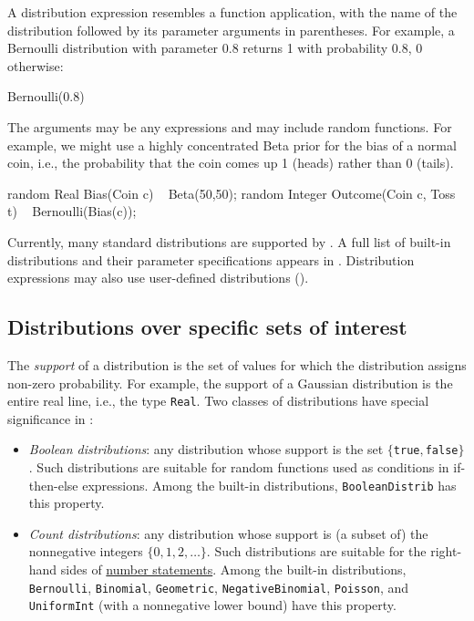 \documentclass[12pt]{article}
\begin{document}
A distribution expression resembles a function application, with the name of the distribution followed by its parameter arguments in parentheses. For example, a Bernoulli distribution with parameter 0.8
returns 1 with probability 0.8, 0 otherwise:
\begin{blogcode}
Bernoulli(0.8)
\end{blogcode}
The arguments may be any expressions and may include random functions. For example,
we might use a highly concentrated Beta prior for the bias of a normal coin, i.e., the probability that the coin comes up 1 (heads) rather than 0 (tails).
\begin{blogcode}
random Real Bias(Coin c) ~ Beta(50,50);
random Integer Outcome(Coin c, Toss t) ~ Bernoulli(Bias(c));
\end{blogcode}
Currently, many standard distributions are supported by \bl. A full
list of built-in distributions and their parameter specifications
appears in . 
Distribution expressions may also use user-defined distributions
().


\subsection{Distributions over specific sets of interest}\label{special-distribution-section}
The {\em support} of a distribution is the set of values for which
the distribution assigns non-zero probability. For example, the
support of a Gaussian distribution is the entire real line, i.e., the
type {\tt Real}. Two classes of distributions have special
significance
in \bl:
\begin{itemize}
\item {\em Boolean distributions}: any distribution whose support is
  the set $\{${\tt true}$,${\tt false}$\}$. Such distributions are
  suitable for random functions used as conditions in if-then-else
  expressions. Among the built-in distributions, {\tt BooleanDistrib}
  has this property.
\item {\em Count distributions}: any distribution whose support is
  (a subset of) the nonnegative integers $\{0,1,2,\ldots\}$. Such distributions are
  suitable for the right-hand sides of
  \hyperref[number-section]{number statements}. Among the built-in
  distributions, {\tt Bernoulli}, {\tt Binomial},
  {\tt Geometric}, {\tt NegativeBinomial}, {\tt Poisson}, and {\tt
    UniformInt} (with a nonnegative lower bound) have this property.
\end{itemize}
\end{document}
